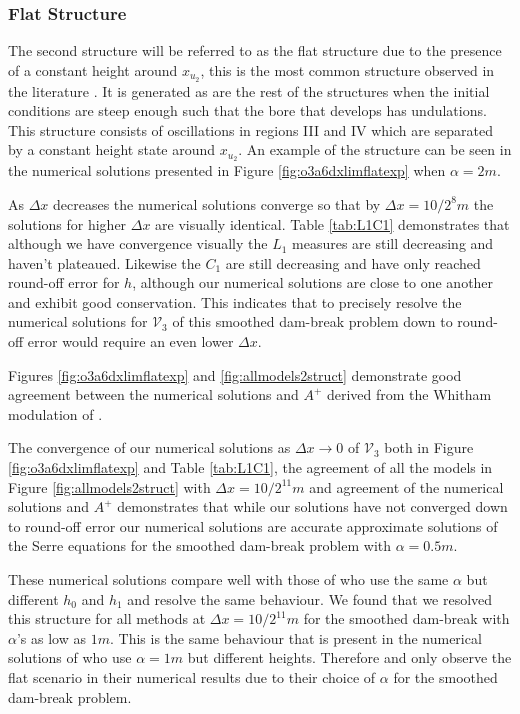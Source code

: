 \documentclass[times]{elsarticle}
\begin{document}
\subsubsection{Flat Structure}
The second structure will be referred to as the flat structure due to the presence of a constant height around $x_{u_2}$, this is the most common structure observed in the literature \cite{Hank-etal-2010-2034,Mitsotakis-etal-2014,Mitsotakis-etal-2017}. It is generated as are the rest of the structures when the initial conditions are steep enough such that the bore that develops has undulations. This structure consists of oscillations in regions III and IV which are separated by a constant height state around $x_{u_2}$. An example of the structure can be seen in the numerical solutions presented in Figure \ref{fig:o3a6dxlimflatexp} when $\alpha = 2m$.

As $\Delta x$ decreases the numerical solutions converge so that by $\Delta x = 10 / 2^8m$ the solutions for higher $\Delta x$ are visually identical. Table \ref{tab:L1C1} demonstrates that although we have convergence visually the $L_1$ measures are still decreasing and haven't plateaued. Likewise the $C_1$ are still decreasing and have only reached round-off error for $h$, although our numerical solutions are close to one another and exhibit good conservation. This indicates that to precisely resolve the numerical solutions for $\mathcal{V}_3$ of this smoothed dam-break problem down to round-off error would require an even lower $\Delta x$.

Figures \ref {fig:o3a6dxlimflatexp} and \ref{fig:allmodels2struct} demonstrate good agreement between the numerical solutions and $A^+$ derived from the Whitham modulation of \citet{El-etal-2006}.

The convergence of our numerical solutions as $\Delta x \rightarrow 0$ of $\mathcal{V}_3$ both in Figure \ref {fig:o3a6dxlimflatexp} and Table \ref{tab:L1C1}, the agreement of all the models in Figure \ref{fig:allmodels2struct} with $\Delta x=10/2^{11}m$ and agreement of the numerical solutions and $A^+$ demonstrates that while our solutions have not converged down to round-off error our numerical solutions are accurate approximate solutions of the Serre equations for the smoothed dam-break problem with $\alpha = 0.5m$.


These numerical solutions compare well with those of \citet{Mitsotakis-etal-2014} who use the same $\alpha$ but different $h_0$ and $h_1$ and resolve the same behaviour. We found that we resolved this structure for all methods at $\Delta x = 10/2^{11}m$ for the smoothed dam-break with $\alpha$'s as low as $1m$. This is the same behaviour that is present in the numerical solutions of \citet{Mitsotakis-etal-2017} who use $\alpha=1m$ but different heights. Therefore \citet{Mitsotakis-etal-2014} and \citet{Mitsotakis-etal-2017} only observe the flat scenario in their numerical results due to their choice of $\alpha$ for the smoothed dam-break problem. 
\end{document}
